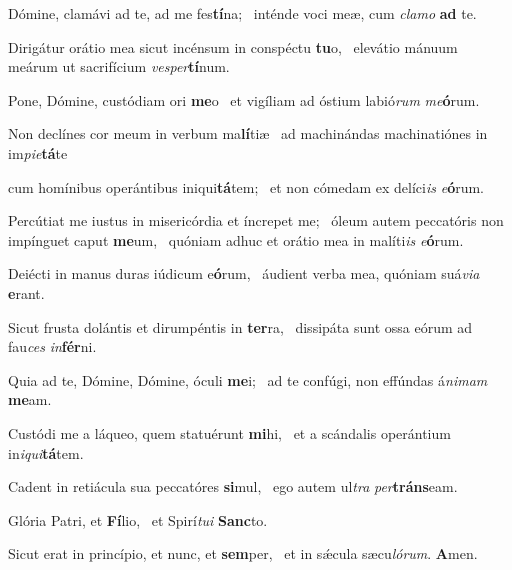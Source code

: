 \item Dómine, clamávi ad te, ad me fes\textbf{tí}na;~\psstar{} inténde voci meæ, cum \textit{clamo} \textbf{ad} te.

\item Dirigátur orátio mea sicut incénsum in conspéctu \textbf{tu}o,~\psstar{} elevátio mánuum meárum ut sacrifícium \textit{vesper}\textbf{tí}num.

\item Pone, Dómine, custódiam ori \textbf{me}o~\psstar{} et vigíliam ad óstium labió\textit{rum} \textit{me}\textbf{ó}rum.

\item Non declínes cor meum in verbum ma\textbf{lí}tiæ~\psstar{} ad machinándas machinatiónes in im\textit{pie}\textbf{tá}te

\item cum homínibus operántibus iniqui\textbf{tá}tem;~\psstar{} et non cómedam ex delíci\textit{is} \textit{e}\textbf{ó}rum.

\item Percútiat me iustus in misericórdia et íncrepet me;~\pscross{} óleum autem peccatóris non impínguet caput \textbf{me}um,~\psstar{} quóniam adhuc et orátio mea in malíti\textit{is} \textit{e}\textbf{ó}rum.

\item Deiécti in manus duras iúdicum e\textbf{ó}rum,~\psstar{} áudient verba mea, quóniam suá\textit{via} \textbf{e}rant.

\item Sicut frusta dolántis et dirumpéntis in \textbf{ter}ra,~\psstar{} dissipáta sunt ossa eórum ad fau\textit{ces} \textit{in}\textbf{fér}ni.

\item Quia ad te, Dómine, Dómine, óculi \textbf{me}i;~\psstar{} ad te confúgi, non effúndas á\textit{nimam} \textbf{me}am.

\item Custódi me a láqueo, quem statuérunt \textbf{mi}hi,~\psstar{} et a scándalis operántium in\textit{iqui}\textbf{tá}tem.

\item Cadent in retiácula sua peccatóres \textbf{si}mul,~\psstar{} ego autem ul\textit{tra} \textit{per}\textbf{tráns}eam.

\item Glória Patri, et \textbf{Fí}lio,~\psstar{} et Spirí\textit{tui} \textbf{Sanc}to.

\item Sicut erat in princípio, et nunc, et \textbf{sem}per,~\psstar{} et in sǽcula sæcu\textit{lórum}. \textbf{A}men.